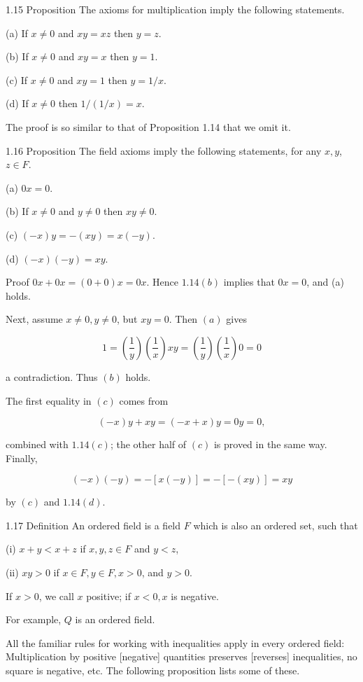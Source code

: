 \documentclass[10pt]{article}
\begin{document}
1.15 Proposition The axioms for multiplication imply the following statements.

(a) If $x \neq 0$ and $x y=x z$ then $y=z$.

(b) If $x \neq 0$ and $x y=x$ then $y=1$.

(c) If $x \neq 0$ and $x y=1$ then $y=1 / x$.

(d) If $x \neq 0$ then $1 /(1 / x)=x$.

The proof is so similar to that of Proposition 1.14 that we omit it.

1.16 Proposition The field axioms imply the following statements, for any $x, y$, $z \in F$.

(a) $0 x=0$.

(b) If $x \neq 0$ and $y \neq 0$ then $x y \neq 0$.

(c) $(-x) y=-(x y)=x(-y)$.

(d) $(-x)(-y)=x y$.

Proof $0 x+0 x=(0+0) x=0 x$. Hence $1.14(b)$ implies that $0 x=0$, and (a) holds.

Next, assume $x \neq 0, y \neq 0$, but $x y=0$. Then $(a)$ gives

$$
1=\left(\frac{1}{y}\right)\left(\frac{1}{x}\right) x y=\left(\frac{1}{y}\right)\left(\frac{1}{x}\right) 0=0
$$

a contradiction. Thus $(b)$ holds.

The first equality in $(c)$ comes from

$$
(-x) y+x y=(-x+x) y=0 y=0,
$$

combined with $1.14(c)$; the other half of $(c)$ is proved in the same way. Finally,

$$
(-x)(-y)=-[x(-y)]=-[-(x y)]=x y
$$

by $(c)$ and $1.14(d)$.

1.17 Definition An ordered field is a field $F$ which is also an ordered set, such that

(i) $x+y<x+z$ if $x, y, z \in F$ and $y<z$,

(ii) $x y>0$ if $x \in F, y \in F, x>0$, and $y>0$.

If $x>0$, we call $x$ positive; if $x<0, x$ is negative.

For example, $Q$ is an ordered field.

All the familiar rules for working with inequalities apply in every ordered field: Multiplication by positive [negative] quantities preserves [reverses] inequalities, no square is negative, etc. The following proposition lists some of these.
\end{document}
